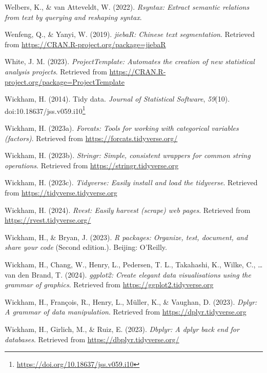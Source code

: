 \documentclass[
  letterpaper,
]{latex/krantz}
\newlength{\cslhangindent}
\newenvironment{CSLReferences}[2] %
 {\begin{list}{}{%
  \setlength{\itemindent}{0pt}
  \setlength{\leftmargin}{0pt}
  \setlength{\parsep}{0pt}
  \ifodd #1
   \setlength{\leftmargin}{\cslhangindent}
   \setlength{\itemindent}{-1\cslhangindent}
  \fi
  \setlength{\itemsep}{#2\baselineskip}}}
 {\end{list}}
\theoremstyle{definition}
\theoremstyle{remark}
\DeclareRobustCommand{\href}[2]{#2\footnote{\url{#1}}}
\begin{document}
\begin{CSLReferences}{1}{0}
Welbers, K., \& van Atteveldt, W. (2022). \emph{Rsyntax: Extract
semantic relations from text by querying and reshaping syntax}.

Wenfeng, Q., \& Yanyi, W. (2019). \emph{jiebaR: Chinese text
segmentation}. Retrieved from
\url{https://CRAN.R-project.org/package=jiebaR}

White, J. M. (2023). \emph{ProjectTemplate: Automates the creation of
new statistical analysis projects}. Retrieved from
\url{https://CRAN.R-project.org/package=ProjectTemplate}

Wickham, H. (2014). Tidy data. \emph{Journal of Statistical Software},
\emph{59}(10).
doi:\href{https://doi.org/10.18637/jss.v059.i10}{10.18637/jss.v059.i10}

Wickham, H. (2023a). \emph{Forcats: Tools for working with categorical
variables (factors)}. Retrieved from
\url{https://forcats.tidyverse.org/}

Wickham, H. (2023b). \emph{Stringr: Simple, consistent wrappers for
common string operations}. Retrieved from
\url{https://stringr.tidyverse.org}

Wickham, H. (2023c). \emph{Tidyverse: Easily install and load the
tidyverse}. Retrieved from \url{https://tidyverse.tidyverse.org}

Wickham, H. (2024). \emph{Rvest: Easily harvest (scrape) web pages}.
Retrieved from \url{https://rvest.tidyverse.org/}

Wickham, H., \& Bryan, J. (2023). \emph{R packages: Organize, test,
document, and share your code} (Second edition.). Beijing: O'Reilly.

Wickham, H., Chang, W., Henry, L., Pedersen, T. L., Takahashi, K.,
Wilke, C., \ldots{} van den Brand, T. (2024). \emph{ggplot2: Create
elegant data visualisations using the grammar of graphics}. Retrieved
from \url{https://ggplot2.tidyverse.org}

Wickham, H., François, R., Henry, L., Müller, K., \& Vaughan, D. (2023).
\emph{Dplyr: A grammar of data manipulation}. Retrieved from
\url{https://dplyr.tidyverse.org}

Wickham, H., Girlich, M., \& Ruiz, E. (2023). \emph{Dbplyr: A dplyr back
end for databases}. Retrieved from \url{https://dbplyr.tidyverse.org/}


\end{CSLReferences}
\end{document}
